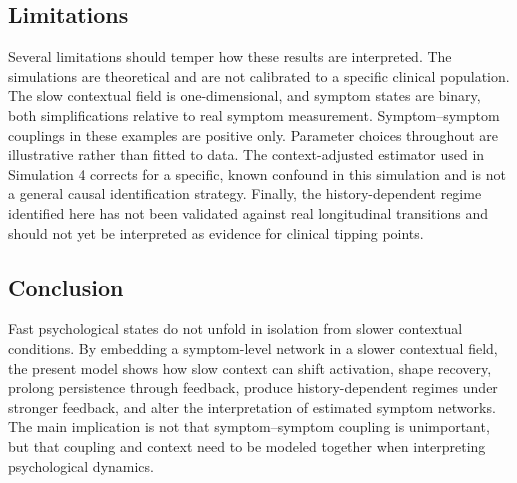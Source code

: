 \subsection{Limitations}
Several limitations should temper how these results are interpreted. The
simulations are theoretical and are not calibrated to a specific clinical
population. The slow contextual field is one-dimensional, and symptom states
are binary, both simplifications relative to real symptom measurement.
Symptom--symptom couplings in these examples are positive only. Parameter
choices throughout are illustrative rather than fitted to data. The
context-adjusted estimator used in Simulation 4 corrects for a specific,
known confound in this simulation and is not a general causal identification
strategy. Finally, the history-dependent regime identified here has not been
validated against real longitudinal transitions and should not yet be
interpreted as evidence for clinical tipping points.

\subsection{Conclusion}
Fast psychological states do not unfold in isolation from slower contextual
conditions. By embedding a symptom-level network in a slower contextual
field, the present model shows how slow context can shift activation, shape
recovery, prolong persistence through feedback, produce history-dependent
regimes under stronger feedback, and alter the interpretation of estimated
symptom networks. The main implication is not that symptom--symptom coupling
is unimportant, but that coupling and context need to be modeled together
when interpreting psychological dynamics.
